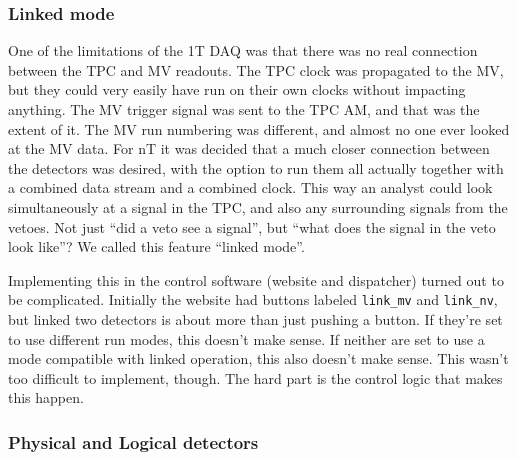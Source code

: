 \subsubsection{Linked mode}

One of the limitations of the 1T DAQ was that there was no real connection between the TPC and MV readouts.
The TPC clock was propagated to the MV, but they could very easily have run on their own clocks without impacting anything.
The MV trigger signal was sent to the TPC AM, and that was the extent of it.
The MV run numbering was different, and almost no one ever looked at the MV data.
For nT it was decided that a much closer connection between the detectors was desired, with the option to run them all actually together with a combined data stream and a combined clock.
This way an analyst could look simultaneously at a signal in the TPC, and also any surrounding signals from the vetoes.
Not just ``did a veto see a signal'', but ``what does the signal in the veto look like''?
We called this feature ``linked mode''.

Implementing this in the control software (website and dispatcher) turned out to be complicated.
Initially the website had buttons labeled \texttt{link\_mv} and \texttt{link\_nv}, but linked two detectors is about more than just pushing a button.
If they're set to use different run modes, this doesn't make sense.
If neither are set to use a mode compatible with linked operation, this also doesn't make sense.
This wasn't too difficult to implement, though.
The hard part is the control logic that makes this happen.

\subsubsection{Physical and Logical detectors}

